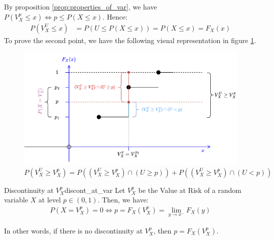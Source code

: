 \begin{proof*}
    By proposition \ref{prop:properties_of_var}, we have $P(V_X^p\le x) \iff p \le P(X\le x)$. Hence:
    \begin{align*}
        P(V_X^U \le x) &= P(U \le P(X\le x)) = P(X\le x) = F_X(x)
    \end{align*}
    \noindent To prove the second point, we have the following visual representation in figure \ref{fig:lemma3.1_illustration}.
    \begin{figure}[ht]
        \centering
        \includegraphics[width=\textwidth]{figures/lemma3.1-illustration.png}
        \caption{$P(V_X^U \ge V_X^p) = P((V_X^U \ge V_X^p) \cap (U \ge p)) + P((V_X^U \ge V_X^p) \cap (U < p))$}
        \label{fig:lemma3.1_illustration}
    \end{figure}
\end{proof*}

\begin{proposition}{Discontinuity at $V_X^p$}{discont_at_var}
    Let $V_X^p$ be the Value at Risk of a random variable $X$ at level $p\in(0,1)$. Then, we have:
    \begin{align*}
        P(X = V_X^p) = 0 \iff p = F_X(V_X^p) = \lim_{y\to x^-}F_X(y)
    \end{align*}

    \noindent\newline In other words, if there is no discontinuity at $V_X^p$, then $p = F_X(V_X^p)$.
\end{proposition}

